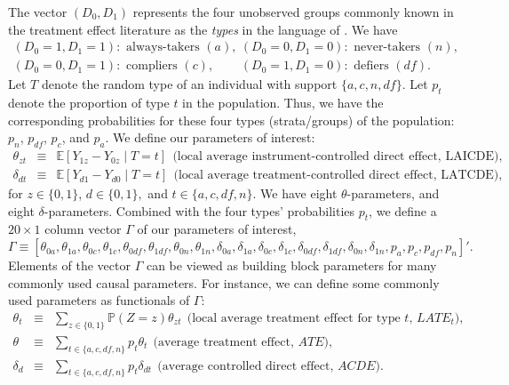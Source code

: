 \documentclass[12pt]{article}
\theoremstyle{plain}
\theoremstyle{definition}
\theoremstyle{remark}
\begin{document}
The vector $\left(D_0, D_1\right)$ represents the four unobserved groups commonly known in the treatment effect literature as the \textit{types} in the language of \cite{Angrist1996IdentificationVariables}. We have
$$
\begin{array}{ll}
\left(D_0=1, D_1=1\right): \text { always-takers }(a), & \left(D_0=0, D_1=0\right): \text { never-takers }(n), \\
\left(D_0=0, D_1=1\right): \text { compliers }(c), & \left(D_0=1, D_1=0\right): \text { defiers }(df) .
\end{array}
$$
Let $T$ denote the random type of an individual with support $\{a, c, n, d f\}$. Let $p_t$ denote the proportion of type $t$ in the population. Thus, we have the corresponding probabilities for these four types (strata/groups) of the population: $p_n$, $p_{df}$, $p_c$, and $p_a$.
We define our parameters of interest: 
\begin{eqnarray*}
    \theta_{zt} &\equiv& \mathbb E[Y_{1z}-Y_{0z} \mid T=t]\ \ \text{(local average instrument-controlled direct effect, LAICDE)},\\
 \delta_{dt} &\equiv& \mathbb E[Y_{d1}-Y_{d0} \mid T=t]\ \ \text{(local average treatment-controlled direct effect, LATCDE)},
\end{eqnarray*}
for $z \in\{0,1\}$, $d \in\{0,1\},$ and $t\in\{a,c,df,n\}$. We have eight $\theta$-parameters, and eight $\delta$-parameters. Combined with the four types' probabilities $p_t$, we define a $20 \times 1$ column vector $\Gamma$ of our parameters of interest,   
$$\Gamma\equiv [\theta_{0a}, \theta_{1a}, \theta_{0c}, \theta_{1c}, \theta_{0df}, \theta_{1df}, \theta_{0n}, \theta_{1n}, \delta_{0a}, \delta_{1a}, \delta_{0c}, \delta_{1c}, \delta_{0df}, \delta_{1df}, \delta_{0n}, \delta_{1n}, p_a, p_c, p_{df}, p_n]'.$$
Elements of the vector $\Gamma$ can be viewed as building block parameters for many commonly used causal parameters. For instance, we can define some commonly used parameters as functionals of $\Gamma$:
\begin{eqnarray*}
    \theta_t &\equiv& \sum_{z\in \{0,1\}} \mathbb P(Z=z) \theta_{zt} \ \ \text{(local average treatment effect for type $t$, $LATE_t$)},\\
   \theta &\equiv& \sum_{t \in \{a,c,df,n\}} p_t \theta_t \ \ \text{(average treatment effect, $ATE$)}, \\
   \delta_d &\equiv& \sum_{t \in \{a,c,df,n\}} p_t \delta_{dt}\ \ \text{(average controlled direct effect, $ACDE$)}.  
\end{eqnarray*}
\end{document}
